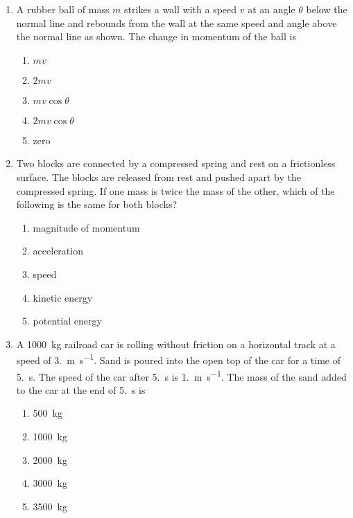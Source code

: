 \documentclass{../../../oss-apphys}
\begin{document}
\begin{multicols}{2}
\begin{enumerate}[leftmargin=18pt]
  \item A rubber ball of mass $m$ strikes a wall with a speed $v$ at an angle
    $\theta$ below the normal line and rebounds from the wall at the same speed
    and angle above the normal line as shown. The change in momentum
    of the ball is
    \begin{center}
    \end{center}
    \begin{enumerate}[noitemsep,topsep=0pt,leftmargin=18pt,label=(\Alph*)]
    \item $mv$
    \item $2mv$
    \item $mv\cos\theta$
    \item $2mv\cos\theta$
    \item  zero
    \end{enumerate}
  
  \item Two blocks are connected by a compressed spring and rest on a
    frictionless surface. The blocks are released from rest and pushed apart
    by the compressed spring. If one mass is twice the mass of the other,
    which of the following is the same for both blocks?
    \begin{enumerate}[noitemsep,topsep=0pt,leftmargin=18pt,label=(\Alph*)]
    \item magnitude of momentum
    \item acceleration
    \item speed
    \item kinetic energy
    \item potential energy
    \end{enumerate}
    \columnbreak
    
  \item A \SI{1000}{\kilo\gram} railroad car is rolling without friction on a
    horizontal track at a speed of \SI{3.}{\metre\per\second}. Sand is poured
    into the open top of the car for a time of \SI{5.}{\second}. The speed of
    the car after \SI{5.}{\second} is \SI{1.}{\metre\per\second}. The mass of
    the sand added to the car at the end of \SI{5.}{\second} is
    \begin{center}
    \end{center}
    \begin{enumerate}[noitemsep,topsep=0pt,leftmargin=18pt,label=(\Alph*)]
    \item\SI{500 }{\kilo\gram}
    \item\SI{1000}{\kilo\gram}
    \item\SI{2000}{\kilo\gram}
    \item\SI{3000}{\kilo\gram}
    \item\SI{3500}{\kilo\gram}
    \end{enumerate}
    

\end{enumerate}
\end{multicols}
\end{document}
